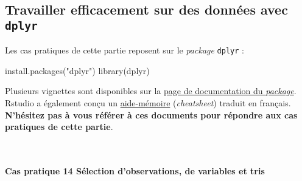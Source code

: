 \documentclass[12pt,]{article}
\newenvironment{Shaded}{}{}
\newcommand{\KeywordTok}[1]{\textcolor[rgb]{0.00,0.00,1.00}{{#1}}}
\newcommand{\StringTok}[1]{\textcolor[rgb]{0.00,0.50,0.50}{{#1}}}
\newcommand{\NormalTok}[1]{{#1}}
\let\oldparagraph\paragraph
\renewcommand{\paragraph}[1]{\oldparagraph{#1}\mbox{}}
\begin{document}
\subsection{\texorpdfstring{Travailler efficacement sur des données avec
\texttt{dplyr}}{Travailler efficacement sur des données avec dplyr}}\label{travailler-efficacement-sur-des-donnees-avec-dplyr}

Les cas pratiques de cette partie reposent sur le \emph{package}
\texttt{dplyr} :

\begin{Shaded}
\begin{Highlighting}[]
\KeywordTok{install.packages}\NormalTok{(}\StringTok{"dplyr"}\NormalTok{)}
\KeywordTok{library}\NormalTok{(dplyr)}
\end{Highlighting}
\end{Shaded}

Plusieurs vignettes sont disponibles sur la
\href{https://CRAN.R-project.org/package=dplyr}{page de documentation du
\emph{package}}. Rstudio a également conçu un
\href{https://www.rstudio.com/wp-content/uploads/2016/01/data-wrangling-french.pdf}{aide-mémoire}
(\emph{cheatsheet}) traduit en français. \textbf{N'hésitez pas à vous
référer à ces documents pour répondre aux cas pratiques de cette
partie}.

~

\paragraph{\texorpdfstring{\textbf{Cas pratique 14} Sélection
d'observations, de variables et
tris}{Cas pratique 14 Sélection d'observations, de variables et tris}}\label{cas-pratique-14-selection-dobservations-de-variables-et-tris}
\end{document}
